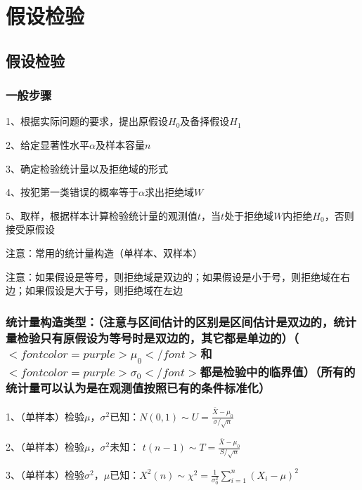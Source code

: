 \chapter{假设检验}

\section{假设检验}



\subsection{一般步骤}

1、根据实际问题的要求，提出原假设$ H_0 $及备择假设$ H_1 $

2、给定显著性水平$ \alpha $及样本容量$ n $

3、确定检验统计量以及拒绝域的形式

4、按犯第一类错误的概率等于$ \alpha $求出拒绝域$ W $

5、取样，根据样本计算检验统计量的观测值$ t $，当$ t $处于拒绝域$ W $内拒绝$ H_0 $，否则接受原假设

注意：常用的统计量构造（单样本、双样本）

注意：如果假设是等号，则拒绝域是双边的；如果假设是小于号，则拒绝域在右边；如果假设是大于号，则拒绝域在左边



\subsection{统计量构造类型：（注意与区间估计的区别是区间估计是双边的，统计量检验只有原假设为等号时是双边的，其它都是单边的）（$ <font color=purple>\mu_0</font> $和$ <font color=purple>\sigma_0</font> $都是检验中的临界值）（所有的统计量可以认为是在观测值按照已有的条件标准化）}

1、（单样本）检验$ \mu $，$ \sigma^{2} $已知：$ N(0,1) \sim U=\frac{\bar{X}-\mu_{0}}{\sigma / \sqrt{n}} $

2、（单样本）检验$ \mu $，$ \sigma^{2} $未知： $ t(n-1) \sim T=\frac{\bar{X}-\mu_{0}}{S / \sqrt{n}} $

3、（单样本）检验$ \sigma^{2} $，$ \mu $已知：$ X^2(n) \sim \chi^{2}=\frac{1}{\sigma_{0}^{2}} \sum_{i=1}^{n}\left(X_{i}-\mu\right)^{2} $

